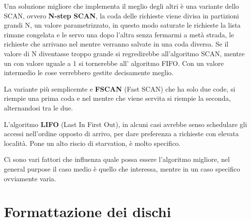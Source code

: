 \documentclass[a4paper, 12pt]{book}
\begin{document}
Una soluzione migliore che implementa il meglio degli altri
è una variante dello SCAN, ovvero \textbf{N-step SCAN}, 
la coda delle richieste viene divisa in partizioni grandi 
N, un valore parametrizzato, in questo modo saturate le richieste 
la lista rimane congelata e le servo una dopo l'altra senza 
fermarmi a metà strada, le richieste che arrivano nel mentre 
verranno salvate in una coda diversa. Se il valore di N 
diventasse troppo grande si regredirebbe all'algoritmo 
SCAN, mentre un con valore uguale a 1 si tornerebbe all'
algoritmo FIFO. Con un valore intermedio le cose verrebbero 
gestite decisamente meglio.

La variante più semplicemte e \textbf{FSCAN} (Fast SCAN)
che ha solo due code, si riempie una prima coda e nel 
mentre che viene servita si riempie la seconda, alternandosi 
tra le due.

L'algoritmo \textbf{LIFO} (Last In First Out), in alcuni 
casi avrebbe senso schedulare gli accessi nell'ordine opposto
di arrivo, per dare preferenza a richieste con elevata località.
Pone un alto riscio di starvation, è molto specifico.

Ci sono vari fattori che influenza quale possa essere 
l'algoritmo migliore, nel general purpose il caso medio 
è quello che interessa, mentre in un caso specifico ovviamente 
varia.

\section{Formattazione dei dischi}
\end{document}

